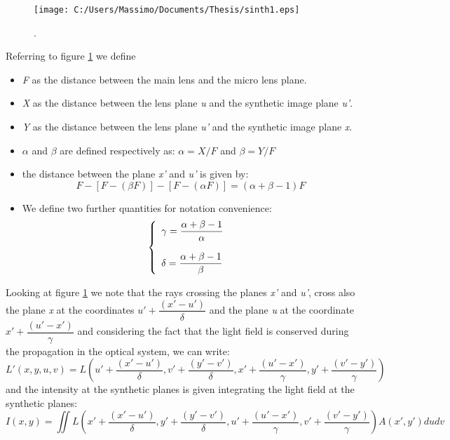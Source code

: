 \begin{figure}[H]
	\centering
	\texttt{[image: C:/Users/Massimo/Documents/Thesis/sinth1.eps]}
	\caption{\label{fig:synthetic1} . }
\end{figure}
Referring to figure \ref{fig:synthetic1} we define
\begin{itemize}
	\item \textit{F} as the distance between the main lens and the micro lens plane.
	\item \textit{X} as the distance between the lens plane \textit{u} and the synthetic image plane \textit{u'}.
	\item \textit{Y} as the distance between the lens plane \textit{u'} and the synthetic image plane \textit{x}.
	\item $\alpha$ and $\beta$ are defined respectively as: $\alpha = X/F$ and $\beta = Y/F$
	\item the distance between the plane \textit{x'} and \textit{u'} is given by: 
	\begin{equation}
	\label{eq:dist1refoc}
	F-[F-(\beta F)]-[F-(\alpha F)]=(\alpha + \beta -1)F
	\end{equation}
	
	\item We define two further quantities for notation convenience:
	\begin{equation}
	\label{eq:refocus1}
	\left\{
	\begin{array}{l l}
	\gamma = \dfrac{\alpha +\beta -1}{\alpha} \\
	\\
	\delta = \dfrac{\alpha +\beta -1}{\beta} 
	\end{array} \right.\
	\end{equation}
\end{itemize}
Looking at figure \ref{fig:synthetic1} we note that the rays crossing the planes \textit{x'} and \textit{u'}, cross also the plane \textit{x} at the coordinates $u'+\dfrac{(x'-u')}{\delta}$ and the plane \textit{u} at the coordinate $x'+\dfrac{(u'-x')}{\gamma}$ and considering the fact that the light field is conserved during the propagation in the optical system,  we can write:
\begin{equation}
\label{eq:synthLF}
L'(x,y,u,v) = L\left(u'+\frac{(x'-u')}{\delta},v'+\frac{(y'-v')}{\delta},x'+\frac{(u'-x')}{\gamma},y'+\frac{(v'-y')}{\gamma}\right)
\end{equation}
and the intensity at the synthetic planes is given integrating the light field at the synthetic planes:
\begin{equation}
\label{eq:synthLF1}
I(x,y) =\iint L\left(x'+\frac{(x'-u')}{\delta},y'+\frac{(y'-v')}{\delta},u'+\frac{(u'-x')}{\gamma},v'+\frac{(v'-y')}{\gamma}\right)A(x',y')dudv
\end{equation}